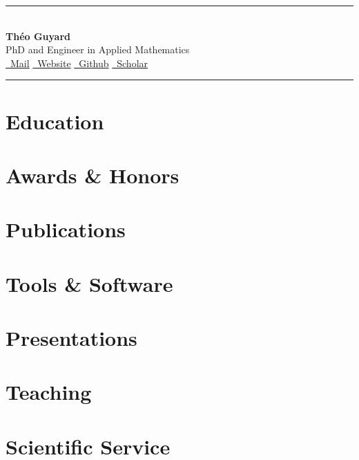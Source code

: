 \documentclass[11pt]{article}
\begin{document}



\begin{center}
  \rule{\textwidth}{2pt} \\[1em]
  {\LARGE\textbf{Théo Guyard}} \\[0.5em]
  {\Large{PhD and Engineer in Applied Mathematics}} \\[1em]
  \href{mailto:theo.guyard.job@gmail.com}{\faEnvelope~Mail}
  \hspace{1em}
  \href{https://theoguyard.github.io}{\faLink~Website}
  \hspace{1em}
  \href{https://github.com/TheoGuyard}{\faGithub~Github}
  \hspace{1em}
  \href{https://scholar.google.com/citations?user=xwtKGaEAAAAJ&hl=en}{\faMortarBoard~Scholar} \\
  \rule{\textwidth}{2pt}
\end{center}

\section*{Education}


\section*{Awards \& Honors}
\label{awards}


\section*{Publications}
\label{publications}


\section*{Tools \& Software}
\label{tools}


\section*{Presentations}
\label{presentations}


\section*{Teaching}
\label{teaching}


\section*{Scientific Service}
\label{service}

\end{document}
